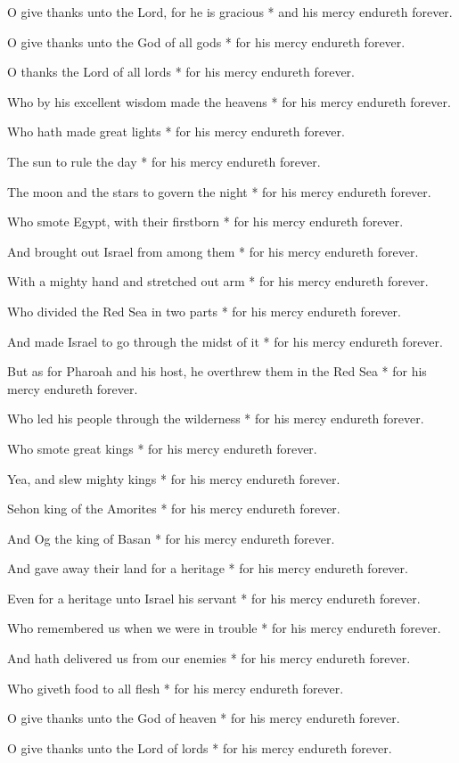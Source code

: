 \begin{multicols}{2}
	
	O give thanks unto the Lord, for he is gracious * and his mercy endureth forever.
	
	O give thanks unto the God of all gods * for his mercy endureth forever.
	
	O thanks the Lord of all lords * for his mercy endureth forever.
	
	Who by his excellent wisdom made the heavens * for his mercy endureth forever.
	
	Who hath made great lights * for his mercy endureth forever.
	
	The sun to rule the day * for his mercy endureth forever.
	
	The moon and the stars to govern the night * for his mercy endureth forever.
	
	Who smote Egypt, with their firstborn * for his mercy endureth forever.
	
	And brought out Israel from among them * for his mercy endureth forever.
	
	With a mighty hand and stretched out arm * for his mercy endureth forever.
	
	Who divided the Red Sea in two parts * for his mercy endureth forever.
	
	And made Israel to go through the midst of it * for his mercy endureth forever.
	
	But as for Pharoah and his host, he overthrew them in the Red Sea * for his mercy endureth forever.
	
	Who led his people through the wilderness * for his mercy endureth forever.
	
	Who smote great kings * for his mercy endureth forever.
	
	Yea, and slew mighty kings * for his mercy endureth forever.
	
	Sehon king of the Amorites * for his mercy endureth forever.
	
	And Og the king of Basan * for his mercy endureth forever.
	
	And gave away their land for a heritage * for his mercy endureth forever.
	
	Even for a heritage unto Israel his servant * for his mercy endureth forever.
	
	Who remembered us when we were in trouble * for his mercy endureth forever.
	
	And hath delivered us from our enemies * for his mercy endureth forever.
	
	Who giveth food to all flesh * for his mercy endureth forever.
	
	O give thanks unto the God of heaven * for his mercy endureth forever.
	
	O give thanks unto the Lord of lords * for his mercy endureth forever.
	
	\gloria{}
\end{multicols}